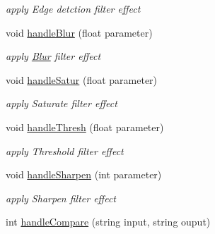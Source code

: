 \begin{DoxyCompactItemize}
\begin{DoxyCompactList}\small\item\em apply Edge detction filter effect \end{DoxyCompactList}\item 
void \hyperlink{classMIACommandLineApp_a9be162f864792a003931a33d24e1fa52}{handle\+Blur} (float parameter)\hypertarget{classMIACommandLineApp_a9be162f864792a003931a33d24e1fa52}{}\label{classMIACommandLineApp_a9be162f864792a003931a33d24e1fa52}

\begin{DoxyCompactList}\small\item\em apply \hyperlink{classBlur}{Blur} filter effect \end{DoxyCompactList}\item 
void \hyperlink{classMIACommandLineApp_a3a3cd95334889d1c5ae8f0871080bd18}{handle\+Satur} (float parameter)\hypertarget{classMIACommandLineApp_a3a3cd95334889d1c5ae8f0871080bd18}{}\label{classMIACommandLineApp_a3a3cd95334889d1c5ae8f0871080bd18}

\begin{DoxyCompactList}\small\item\em apply Saturate filter effect \end{DoxyCompactList}\item 
void \hyperlink{classMIACommandLineApp_a80568f718b9ed0d0b520cc5f1fb72ca0}{handle\+Thresh} (float parameter)\hypertarget{classMIACommandLineApp_a80568f718b9ed0d0b520cc5f1fb72ca0}{}\label{classMIACommandLineApp_a80568f718b9ed0d0b520cc5f1fb72ca0}

\begin{DoxyCompactList}\small\item\em apply Threshold filter effect \end{DoxyCompactList}\item 
void \hyperlink{classMIACommandLineApp_ae231f6b1b186a3f4ae7d168175e7fac4}{handle\+Sharpen} (int parameter)\hypertarget{classMIACommandLineApp_ae231f6b1b186a3f4ae7d168175e7fac4}{}\label{classMIACommandLineApp_ae231f6b1b186a3f4ae7d168175e7fac4}

\begin{DoxyCompactList}\small\item\em apply Sharpen filter effect \end{DoxyCompactList}\item 
int \hyperlink{classMIACommandLineApp_afc01f09633833fa92beedb52f2098ca7}{handle\+Compare} (string input, string ouput)\hypertarget{classMIACommandLineApp_afc01f09633833fa92beedb52f2098ca7}{}\label{classMIACommandLineApp_afc01f09633833fa92beedb52f2098ca7}


\end{DoxyCompactItemize}
